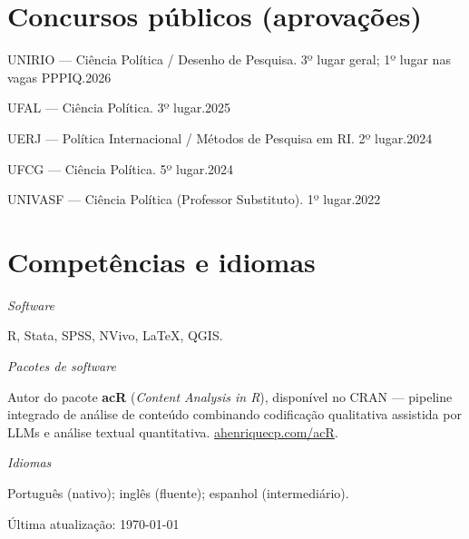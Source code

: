 \documentclass[11pt]{article}
\newcommand{\cvsubsection}[1]{\vspace{0.9em}\textit{#1}\par\vspace{0.35em}}
\newcommand{\entryplain}[2]{\noindent#1\hfill #2\par\vspace{0.15em}}
\begin{document}
\section{Concursos públicos (aprovações)}

\entryplain{UNIRIO --- Ciência Política / Desenho de Pesquisa. 3º lugar geral; 1º lugar nas vagas PPPIQ.}{2026}
\entryplain{UFAL --- Ciência Política. 3º lugar.}{2025}
\entryplain{UERJ --- Política Internacional / Métodos de Pesquisa em RI. 2º lugar.}{2024}
\entryplain{UFCG --- Ciência Política. 5º lugar.}{2024}
\entryplain{UNIVASF --- Ciência Política (Professor Substituto). 1º lugar.}{2022}

\section{Competências e idiomas}
\cvsubsection{Software}
R, Stata, SPSS, NVivo, \LaTeX, QGIS.

\cvsubsection{Pacotes de software}
Autor do pacote \textbf{acR} (\textit{Content Analysis in R}), disponível no CRAN --- pipeline integrado de análise de conteúdo combinando codificação qualitativa assistida por LLMs e análise textual quantitativa. \href{https://ahenriquecp.com/acR/}{ahenriquecp.com/acR}.

\cvsubsection{Idiomas}
Português (nativo); inglês (fluente); espanhol (intermediário).

\vspace{1.2em}
\begin{center}
\footnotesize Última atualização: \today
\end{center}
\end{document}
